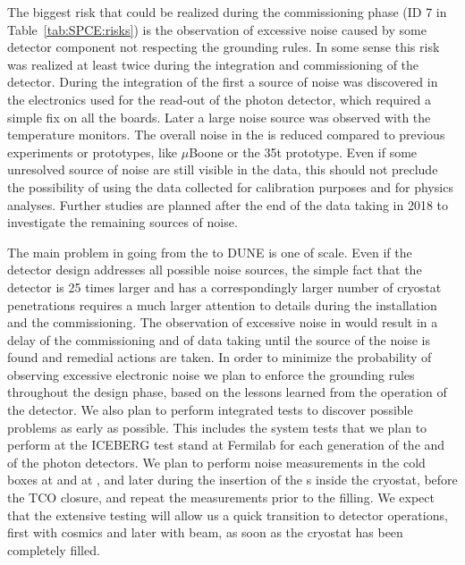 The biggest risk that could be realized during the commissioning phase
(ID 7 in Table~\ref{tab:SPCE:risks}) is the observation of excessive noise 
caused by some detector component not respecting the  grounding
rules. In some sense this risk was realized at least twice during the 
integration and commissioning of the  detector. During the 
integration of the first  a source of noise was discovered 
in the electronics used for the read-out of the photon  detector, which 
required a simple fix on all the boards. Later a large noise source was 
observed with the temperature monitors. The overall noise in the  
is reduced compared to previous  experiments or prototypes, 
like $\mu$Boone or the 35t prototype. Even if some unresolved source of noise 
are still visible in the  data, this should not preclude the 
possibility of using the data collected for calibration purposes and for 
physics analyses. Further studies are planned after the end of the 
data taking in 2018 to investigate the remaining sources of noise.

The main problem in going from the  to DUNE is one of scale.
Even if the detector design addresses all possible noise sources, the simple
fact that the detector is 25 times larger and has a correspondingly larger
number of cryostat penetrations requires a much larger attention to details
during the installation and the commissioning. The observation of excessive 
noise in  would result in a delay of the commissioning and of 
data taking until the source of the noise is found and remedial actions 
are taken. In order to minimize the probability of observing excessive 
electronic noise we plan to enforce the grounding  rules throughout the 
design phase, based on the lessons learned from the operation of the 
 detector. We also plan to perform  integrated tests to discover 
possible problems as early as possible. This includes the system tests that 
we plan to perform at the ICEBERG test stand at Fermilab for each generation 
of the  and of the photon detectors. We plan to perform noise 
measurements in the cold boxes at  and at \surf, and later 
during the insertion of the s inside the cryostat, before the 
TCO closure, and repeat the measurements prior to the  filling. 
We expect that the extensive testing will allow us a quick transition to 
detector operations, first with cosmics and later with beam, as soon as the 
cryostat has been completely filled. 

